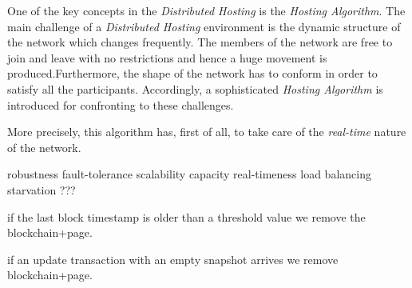 
One of the key concepts in the \textit{Distributed Hosting} is the \textit{Hosting Algorithm}. 
The main challenge of a \textit{Distributed Hosting} environment is the dynamic structure of the network which changes frequently. The members of the network are free to join and leave with no restrictions and hence a huge movement is produced.Furthermore, the shape of the network has to conform in order to satisfy all the participants. Accordingly, a sophisticated \textit{Hosting Algorithm} is introduced for confronting to these challenges. 

More precisely, this algorithm has, first of all, to take care of the \textit{real-time} nature of the network.  







robustness
fault-tolerance
scalability
capacity
real-timeness
load balancing
starvation ???

if the last block timestamp is older than a threshold value we remove the blockchain+page. 

if an update transaction with an empty snapshot arrives we remove blockchain+page.